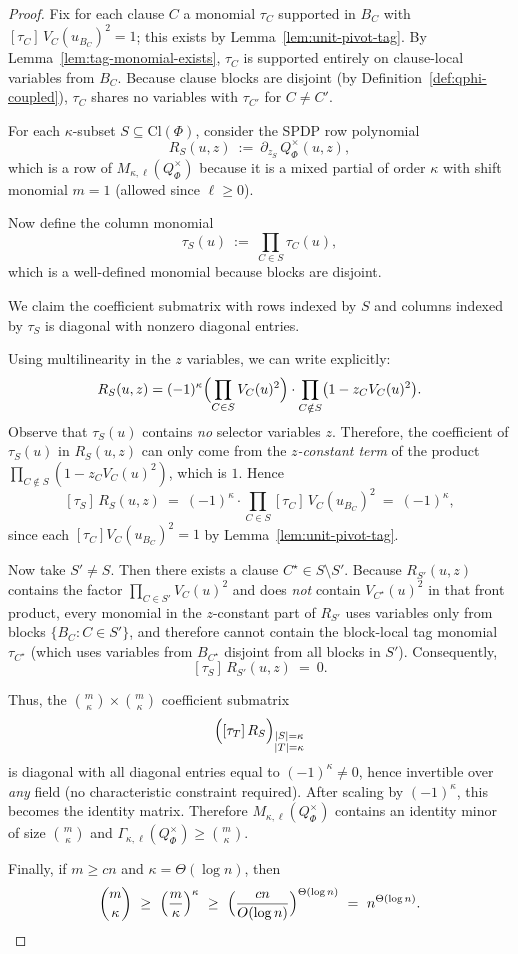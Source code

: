 \documentclass[12pt]{article}
\theoremstyle{definition}
\theoremstyle{definition}
\theoremstyle{remark}
\theoremstyle{remark}
\begin{document}
\begin{proof}
Fix for each clause $C$ a monomial $\tau_C$ supported in $B_C$ with
$[\tau_C]\,V_C(u_{B_C})^2 = 1$; this exists by Lemma~\ref{lem:unit-pivot-tag}.
By Lemma~\ref{lem:tag-monomial-exists}, $\tau_C$ is supported entirely on clause-local variables
from $B_C$. Because clause blocks are disjoint (by Definition~\ref{def:qphi-coupled}),
$\tau_C$ shares no variables with $\tau_{C'}$ for $C\neq C'$.

For each $\kappa$-subset $S\subseteq \mathrm{Cl}(\Phi)$, consider the SPDP row polynomial
\[
R_S(u,z)\ :=\ \partial_{z_S}\,Q_\Phi^{\times}(u,z),
\]
which is a row of $M_{\kappa,\ell}(Q_\Phi^{\times})$ because it is a mixed partial of order $\kappa$
with shift monomial $m=1$ (allowed since $\ell\ge 0$).

Now define the column monomial
\[
\tau_S(u)\ :=\ \prod_{C\in S} \tau_C(u),
\]
which is a well-defined monomial because blocks are disjoint.

We claim the coefficient submatrix with rows indexed by $S$ and columns indexed by $\tau_S$
is diagonal with nonzero diagonal entries.

Using multilinearity in the $z$ variables, we can write explicitly:
\[
R_S(u,z)
=
(-1)^\kappa\Bigl(\prod_{C\in S} V_C(u)^2\Bigr)\cdot
\prod_{C\notin S}\bigl(1 - z_C V_C(u)^2\bigr).
\]
Observe that $\tau_S(u)$ contains \emph{no} selector variables $z$. Therefore, the coefficient
of $\tau_S(u)$ in $R_S(u,z)$ can only come from the \emph{$z$-constant term} of the product
$\prod_{C\notin S}(1 - z_C V_C(u)^2)$, which is $1$. Hence
\[
[\tau_S]\,R_S(u,z)\ =\ (-1)^\kappa\cdot \prod_{C\in S} [\tau_C]\,V_C(u_{B_C})^2\ =\ (-1)^\kappa,
\]
since each $[\tau_C]V_C(u_{B_C})^2 = 1$ by Lemma~\ref{lem:unit-pivot-tag}.

Now take $S'\neq S$. Then there exists a clause $C^\star\in S\setminus S'$.
Because $R_{S'}(u,z)$ contains the factor $\prod_{C\in S'} V_C(u)^2$ and does \emph{not} contain
$V_{C^\star}(u)^2$ in that front product, every monomial in the $z$-constant part of $R_{S'}$
uses variables only from blocks $\{B_C:C\in S'\}$, and therefore cannot contain the block-local
tag monomial $\tau_{C^\star}$ (which uses variables from $B_{C^\star}$ disjoint from all blocks in $S'$).
Consequently,
\[
[\tau_S]\,R_{S'}(u,z)\ =\ 0.
\]

Thus, the $\binom{m}{\kappa}\times \binom{m}{\kappa}$ coefficient submatrix
\[
\Bigl([\tau_T]\,R_S\Bigr)_{\substack{|S|=\kappa\\ |T|=\kappa}}
\]
is diagonal with all diagonal entries equal to $(-1)^\kappa \neq 0$, hence invertible over \emph{any} field
(no characteristic constraint required). After scaling by $(-1)^\kappa$, this becomes the identity matrix. Therefore
$M_{\kappa,\ell}(Q_\Phi^{\times})$ contains an identity minor of size $\binom{m}{\kappa}$ and
$\Gamma_{\kappa,\ell}(Q_\Phi^{\times})\ge \binom{m}{\kappa}$.

Finally, if $m\ge c n$ and $\kappa=\Theta(\log n)$, then
\[
\binom{m}{\kappa}\ \ge\ \Bigl(\frac{m}{\kappa}\Bigr)^\kappa\ \ge\ \Bigl(\frac{c n}{O(\log n)}\Bigr)^{\Theta(\log n)}
\ =\ n^{\Theta(\log n)}.
\]
\end{proof}
\end{document}
